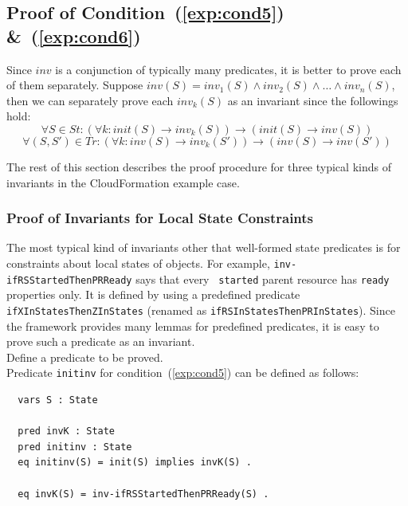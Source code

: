 \documentclass[12pt]{report}
\newcommand{\ra}{\rightarrow}
\begin{document}
\subsection{Proof of Condition~(\ref{exp:cond5}) \&~(\ref{exp:cond6})}
\label{sec:TOSCAinvariant}
Since $inv$ is a conjunction of typically many predicates, it is
better to prove each of them separately. Suppose $inv(S) =
inv_1(S)\land inv_2(S)\land\dots\land inv_n(S)$, then we can
separately prove each $inv_k(S)$ as an invariant since the followings
hold:
\[\forall S\in St: (\forall k:init(S)\ra inv_k(S))\ra(init(S)\ra inv(S))\]
\[\forall (S,S')\in Tr: (\forall k:inv(S)\ra inv_k(S'))\ra(inv(S)\ra inv(S'))\]

\vspace{0.3cm}
The rest of this section describes the proof procedure for three
typical kinds of invariants in the CloudFormation example case.

\subsubsection*{Proof of Invariants for Local State Constraints}
The most typical kind of invariants other that well-formed state
predicates is for constraints about local states of objects.  For
example, {\tt inv-ifRSStartedThenPRReady} says that every {\tt
  started} parent resource has {\tt ready} properties only.  It is
defined by using a predefined predicate {\tt ifXInStatesThenZInStates}
(renamed as {\tt ifRSInStatesThenPRInStates}). Since the framework
provides many lemmas for predefined predicates, it is easy to
prove such a predicate as an invariant. \\

 Define a predicate to be proved. \\ Predicate
         {\tt initinv} for condition~(\ref{exp:cond5}) can be defined
         as follows:
\small
\begin{verbatim}
  vars S : State

  pred invK : State
  pred initinv : State
  eq initinv(S) = init(S) implies invK(S) .

  eq invK(S) = inv-ifRSStartedThenPRReady(S) .
\end{verbatim}
\normalsize
\end{document}
